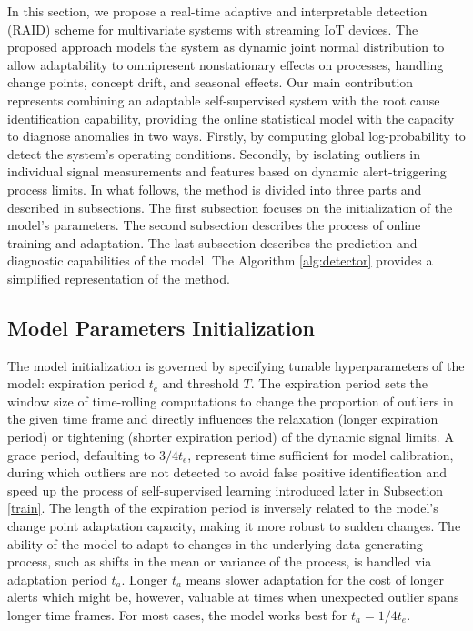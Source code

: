 In this section, we propose a real-time adaptive and interpretable detection (RAID) scheme for multivariate systems with streaming IoT devices. The proposed approach models the system as dynamic joint normal distribution to allow adaptability to omnipresent nonstationary effects on processes, handling change points, concept drift, and seasonal effects. Our main contribution represents combining an adaptable self-supervised system with the root cause identification capability, providing the online statistical model with the capacity to diagnose anomalies in two ways. Firstly, by computing global log-probability to detect the system's operating conditions. Secondly, by isolating outliers in individual signal measurements and features based on dynamic alert-triggering process limits. In what follows, the method is divided into three parts and described in subsections. The first subsection focuses on the initialization of the model's parameters. The second subsection describes the process of online training and adaptation. The last subsection describes the prediction and diagnostic capabilities of the model. The Algorithm \ref{alg:detector} provides a simplified representation of the method.

\subsection{Model Parameters Initialization}\label{init}
The model initialization is governed by specifying tunable hyperparameters of the model: expiration period $t_e$ and threshold $T$. The expiration period sets the window size of time-rolling computations to change the proportion of outliers in the given time frame and directly influences the relaxation (longer expiration period) or tightening (shorter expiration period) of the dynamic signal limits. A grace period, defaulting to $3/4 t_e$, represent time sufficient for model calibration, during which outliers are not detected to avoid false positive identification and speed up the process of self-supervised learning introduced later in Subsection \ref{train}. The length of the expiration period is inversely related to the model's change point adaptation capacity, making it more robust to sudden changes. The ability of the model to adapt to changes in the underlying data-generating process, such as shifts in the mean or variance of the process, is handled via adaptation period $t_a$. Longer $t_a$ means slower adaptation for the cost of longer alerts which might be, however, valuable at times when unexpected outlier spans longer time frames. For most cases, the model works best for $t_a = 1/4 t_e$.

